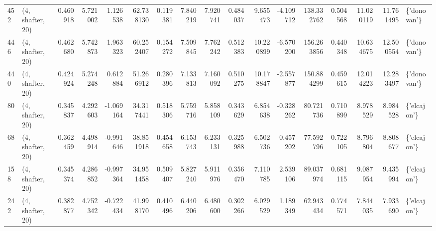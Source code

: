 \begin{tabular}{llrrrrrrrrrrrrrrl}
452 &  (4, shafter, 20) &   0.460918 &   5.721002 &   1.126538 &    62.738130 &   0.119381 &   7.840219 &   7.920741 &  0.484037 &   9.655473 &  -4.109712 &   138.332762 &   0.504568 &  11.020119 &  11.761495 &  \{'donovan'\} \\
446 &  (4, shafter, 20) &   0.462680 &   5.742873 &   1.963323 &    60.252407 &   0.154272 &   7.509845 &   7.762242 &  0.512383 &  10.220899 &  -6.570200 &   156.263856 &   0.440348 &  10.634675 &  12.500554 &  \{'donovan'\} \\
440 &  (4, shafter, 20) &   0.424924 &   5.274248 &   0.612884 &    51.266912 &   0.280396 &   7.133813 &   7.160092 &  0.510275 &  10.178847 &  -2.557877 &   150.884299 &   0.459615 &  12.014223 &  12.283497 &  \{'donovan'\} \\
80  &  (4, shafter, 20) &   0.345837 &   4.292603 &  -1.069164 &    34.317441 &   0.518306 &   5.759716 &   5.858109 &  0.343629 &   6.854638 &  -0.328262 &    80.721736 &   0.710899 &   8.978529 &   8.984528 &  \{'elcajon'\} \\
68  &  (4, shafter, 20) &   0.362459 &   4.498914 &  -0.991646 &    38.851918 &   0.454658 &   6.153743 &   6.233131 &  0.325988 &   6.502736 &   0.457202 &    77.592796 &   0.722105 &   8.796804 &   8.808677 &  \{'elcajon'\} \\
158 &  (4, shafter, 20) &   0.345374 &   4.286852 &  -0.997364 &    34.951458 &   0.509407 &   5.827240 &   5.911976 &  0.356470 &   7.110785 &   2.539106 &    89.037974 &   0.681115 &   9.087954 &   9.435994 &  \{'elcajon'\} \\
242 &  (4, shafter, 20) &   0.382877 &   4.752342 &  -0.722434 &    41.998170 &   0.410496 &   6.440206 &   6.480600 &  0.302266 &   6.029529 &   1.189349 &    62.943434 &   0.774571 &   7.844035 &   7.933690 &  \{'elcajon'\} \\
\bottomrule
\end{tabular}
